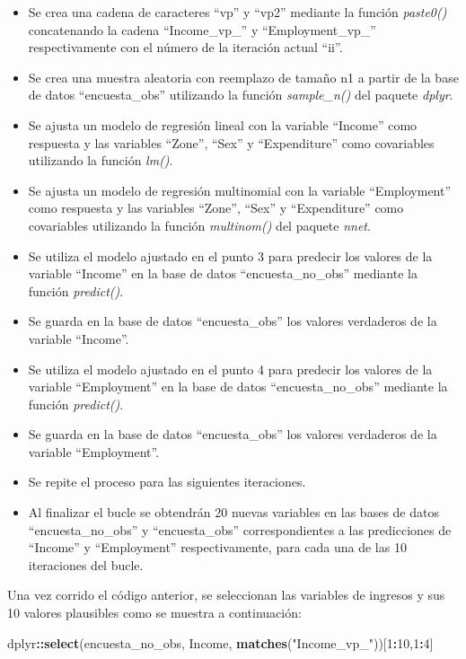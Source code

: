 \documentclass[
  spanish,
  12pt,
]{book}
\newenvironment{Shaded}{\begin{snugshade}}{\end{snugshade}}
\newcommand{\DecValTok}[1]{\textcolor[rgb]{0.00,0.00,0.81}{#1}}
\newcommand{\FunctionTok}[1]{\textcolor[rgb]{0.13,0.29,0.53}{\textbf{#1}}}
\newcommand{\NormalTok}[1]{#1}
\newcommand{\SpecialCharTok}[1]{\textcolor[rgb]{0.81,0.36,0.00}{\textbf{#1}}}
\newcommand{\StringTok}[1]{\textcolor[rgb]{0.31,0.60,0.02}{#1}}
\begin{document}
\begin{itemize}
\item
  Se crea una cadena de caracteres ``vp'' y ``vp2'' mediante la función \emph{paste0()} concatenando la cadena ``Income\_vp\_'' y ``Employment\_vp\_'' respectivamente con el número de la iteración actual ``ii''.
\item
  Se crea una muestra aleatoria con reemplazo de tamaño n1 a partir de la base de datos ``encuesta\_obs'' utilizando la función \emph{sample\_n()} del paquete \emph{dplyr}.
\item
  Se ajusta un modelo de regresión lineal con la variable ``Income'' como respuesta y las variables ``Zone'', ``Sex'' y ``Expenditure'' como covariables utilizando la función \emph{lm()}.
\item
  Se ajusta un modelo de regresión multinomial con la variable ``Employment'' como respuesta y las variables ``Zone'', ``Sex'' y ``Expenditure'' como covariables utilizando la función \emph{multinom()} del paquete \emph{nnet}.
\item
  Se utiliza el modelo ajustado en el punto 3 para predecir los valores de la variable ``Income'' en la base de datos ``encuesta\_no\_obs'' mediante la función \emph{predict()}.
\item
  Se guarda en la base de datos ``encuesta\_obs'' los valores verdaderos de la variable ``Income''.
\item
  Se utiliza el modelo ajustado en el punto 4 para predecir los valores de la variable ``Employment'' en la base de datos ``encuesta\_no\_obs'' mediante la función \emph{predict()}.
\item
  Se guarda en la base de datos ``encuesta\_obs'' los valores verdaderos de la variable ``Employment''.
\item
  Se repite el proceso para las siguientes iteraciones.
\item
  Al finalizar el bucle se obtendrán 20 nuevas variables en las bases de datos ``encuesta\_no\_obs'' y ``encuesta\_obs'' correspondientes a las predicciones de ``Income'' y ``Employment'' respectivamente, para cada una de las 10 iteraciones del bucle.
\end{itemize}

Una vez corrido el código anterior, se seleccionan las variables de ingresos y sus 10 valores plausibles como se muestra a continuación:

\begin{Shaded}
\begin{Highlighting}[]
\NormalTok{dplyr}\SpecialCharTok{::}\FunctionTok{select}\NormalTok{(encuesta\_no\_obs, Income, }\FunctionTok{matches}\NormalTok{(}\StringTok{"Income\_vp\_"}\NormalTok{))[}\DecValTok{1}\SpecialCharTok{:}\DecValTok{10}\NormalTok{,}\DecValTok{1}\SpecialCharTok{:}\DecValTok{4}\NormalTok{]}
\end{Highlighting}
\end{Shaded}
\end{document}
